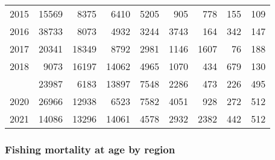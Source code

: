 \documentclass[
]{article}
\begin{document}
\begin{longtable}[t]{lrrrrrrrr}
2015 & 15569 & 8375 & 6410 & 5205 & 905 & 778 & 155 & 109\\
2016 & 38733 & 8073 & 4932 & 3244 & 3743 & 164 & 342 & 147\\
2017 & 20341 & 18349 & 8792 & 2981 & 1146 & 1607 & 76 & 188\\
2018 & 9073 & 16197 & 14062 & 4965 & 1070 & 434 & 679 & 130\\
\addlinespace
2019 & 23987 & 6183 & 13897 & 7548 & 2286 & 473 & 226 & 495\\
2020 & 26966 & 12938 & 6523 & 7582 & 4051 & 928 & 272 & 512\\
2021 & 14086 & 13296 & 14061 & 4578 & 2932 & 2382 & 442 & 512\\*
\end{longtable}

\hypertarget{fishing-mortality-at-age-by-region}{%
\subsubsection{Fishing mortality at age by
region}\label{fishing-mortality-at-age-by-region}}
\end{document}
